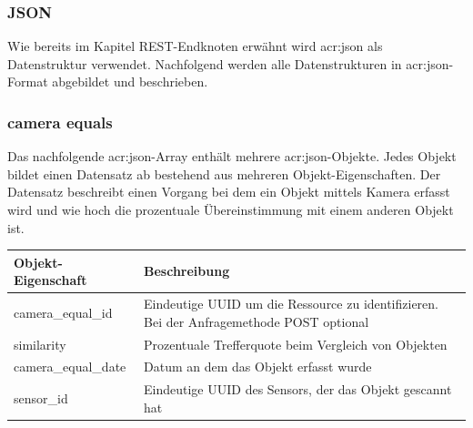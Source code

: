 \subsubsection{JSON}%
\label{sec:rest.json}
Wie bereits im Kapitel REST-Endknoten erwähnt wird \acrshort{acr:json} als Datenstruktur verwendet. Nachfolgend werden alle Datenstrukturen in \acrshort{acr:json}-Format abgebildet und beschrieben.

\subsubsection{camera equals}%
\label{sec:rest.json.camera_equals}
Das nachfolgende \acrshort{acr:json}-Array enthält mehrere \acrshort{acr:json}-Objekte. Jedes Objekt bildet einen Datensatz ab bestehend aus mehreren Objekt-Eigenschaften. Der Datensatz beschreibt einen Vorgang bei dem ein Objekt mittels Kamera erfasst wird und wie hoch die prozentuale Übereinstimmung mit einem anderen Objekt ist.

\begin{jsoncode}
\end{jsoncode}

\begin{table}[H]
  \begin{tabularx}{\textwidth}{lX}
    \textbf{Objekt-Eigenschaft} & \textbf{Beschreibung} \\ \toprule
    camera\_equal\_id           & Eindeutige UUID um die Ressource zu identifizieren. Bei der Anfragemethode POST optional  \\
    similarity                  & Prozentuale Trefferquote beim Vergleich von Objekten \\
    camera\_equal\_date         & Datum an dem das Objekt erfasst wurde  \\
    sensor\_id                  & Eindeutige UUID des Sensors, der das Objekt gescannt hat
  \end{tabularx}
\end{table}

